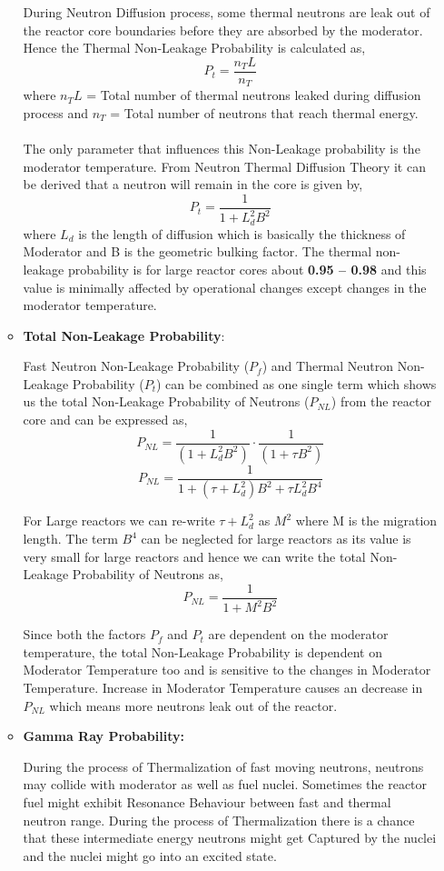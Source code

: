 \documentclass{article}
\begin{document}
\begin{itemize}
\begin{itemize}
    During Neutron Diffusion process, some thermal neutrons are leak out of the reactor core boundaries before they are absorbed by the moderator. Hence the Thermal Non-Leakage Probability is calculated as,
    $$P_t = \frac{n_TL}{n_T}$$
    where $n_TL$ = Total number of thermal neutrons leaked during diffusion process and $n_T$ = Total number of neutrons that reach thermal energy.\\
    \\
    The only parameter that influences this Non-Leakage probability is the moderator temperature. From Neutron Thermal Diffusion Theory it can be derived that a neutron will remain in the core is given by,
    $$P_t = \frac{1}{1 + L_d^2B^2}$$
    where $L_d$ is the length of diffusion which is basically the thickness of Moderator and B is the geometric bulking factor.
    The thermal non-leakage probability is for large reactor cores about \textbf{0.95 – 0.98} and this value is minimally affected by operational changes except changes in the moderator temperature.\cite{cite11}\\

  \item\textbf{ Total Non-Leakage Probability}:

    Fast Neutron Non-Leakage Probability ($P_f$) and Thermal Neutron Non-Leakage Probability ($P_t$) can be combined as one single term which shows us the total Non-Leakage Probability of Neutrons ($P_{NL}$) from the reactor core and can be expressed as,
    \[P_{NL} = \frac{1}{(1 + L_d^2B^2)}\cdot \frac{1}{(1 + \tau B^2)}\]
    \[P_{NL} = \frac{1}{1 + (\tau + L_d^2)B^2 + \tau L_d^2B^4}\]

    For Large reactors we can re-write $\tau + L_d^2$ as $M^2$ where M is the migration length. The term $B^4$ can be neglected for large reactors as its value is very small for large reactors and hence we can write the total Non-Leakage Probability of Neutrons as,
    \[P_{NL} = \frac{1}{1 + M^2B^2}\]

    Since both the factors $P_f$ and $P_t$ are dependent on the moderator temperature, the total Non-Leakage Probability is dependent on Moderator Temperature too and is sensitive to the changes in Moderator Temperature. Increase in Moderator Temperature causes an decrease in $P_{NL}$ which means more neutrons leak out of the reactor.\cite{cite13}

  \item\textbf{ Gamma Ray Probability:}

    During the process of Thermalization of fast moving neutrons, neutrons may collide with moderator as well as fuel nuclei. Sometimes the reactor fuel might exhibit Resonance Behaviour between fast and thermal neutron range. During the process of Thermalization there is a chance that these intermediate energy neutrons might get Captured by the nuclei and the nuclei might go into an excited state.


\end{itemize}
\end{itemize}
\end{document}
